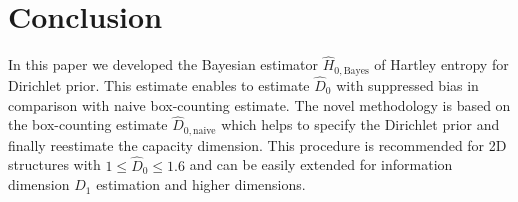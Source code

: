 \section {Conclusion}
In this paper we developed the Bayesian estimator $\hat{H}_{0,\mathrm{Bayes}}$ of Hartley entropy for Dirichlet prior. This estimate enables to estimate $\hat{D}_{0}$ with suppressed bias in comparison with naive box-counting estimate. The novel methodology is based on the box-counting estimate $\hat{D}_{0,\mathrm{naive}}$ which helps to specify the Dirichlet prior and finally reestimate the capacity dimension. This procedure is recommended for 2D structures with $1 \leq \hat{D}_{0} \leq 1.6$ and can be easily extended for information dimension $D_1$ estimation and higher dimensions.